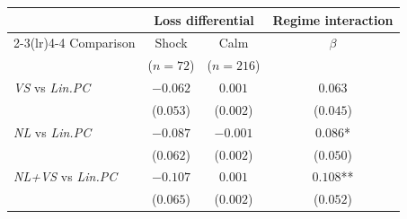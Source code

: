 \begin{tabular}{lccc}
\toprule
 & \multicolumn{2}{c}{Loss differential} & Regime interaction \\
\cmidrule(lr){2-3}\cmidrule(lr){4-4}
Comparison & Shock & Calm & $\beta$ \\
 & ($n{=}72$) & ($n{=}216$) & \\
\midrule
\emph{VS} vs \emph{Lin.PC} & $-0.062$ & $0.001$ & $0.063$ \\
 & \footnotesize($0.053$) & \footnotesize($0.002$) & \footnotesize($0.045$) \\[4pt]
\emph{NL} vs \emph{Lin.PC} & $-0.087$ & $-0.001$ & $0.086$* \\
 & \footnotesize($0.062$) & \footnotesize($0.002$) & \footnotesize($0.050$) \\[4pt]
\emph{NL+VS} vs \emph{Lin.PC} & $-0.107$ & $0.001$ & $0.108$** \\
 & \footnotesize($0.065$) & \footnotesize($0.002$) & \footnotesize($0.052$) \\[4pt]
\bottomrule
\end{tabular}
